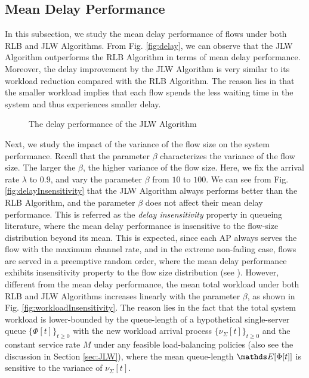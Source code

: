 \documentclass[10pt, conference, letterpaper]{IEEEtran} %
\begin{document}
\subsection{Mean Delay Performance}

In this subsection, we study the mean delay performance of flows under both RLB and JLW Algorithms. From Fig. \ref{fig:delay}, we can observe that the JLW Algorithm outperforms the RLB Algorithm in terms of mean delay performance. Moreover, the delay improvement by the JLW Algorithm is very similar to its workload reduction compared with the RLB Algorithm. The reason lies in that the smaller workload implies that each flow spends the less waiting time in the system and thus experiences smaller delay.

\begin{figure}[!hbt]
\vspace{-0.2in}
\centerline{ }\caption{The delay performance of the JLW Algorithm}
\vspace{-0.15in}
\end{figure}

Next, we study the impact of the variance of the flow size on the system performance. Recall that the parameter $\beta$ characterizes the variance of the flow size. The larger the $\beta$, the higher variance of the flow size. Here, we fix the arrival rate $\lambda$ to $0.9$, and vary the parameter $\beta$ from $10$ to $100$. We can see from Fig. \ref{fig:delayInsensitivity} that the JLW Algorithm always performs better than the RLB Algorithm, and the parameter $\beta$ does not affect their mean delay performance. This is referred as the \emph{delay insensitivity} property in queueing literature, where the mean delay performance is insensitive to the flow-size distribution beyond its mean. This is expected, since each AP always serves the flow with the maximum channel rate, and in the extreme non-fading case, flows are served in a preemptive random order, where the mean delay performance exhibits insensitivity property to the flow size distribution (see \cite{henderson1992insensitivity}). However, different from the mean delay performance, the mean total workload under both RLB and JLW Algorithms increases linearly with the parameter $\beta$, as shown in Fig. \ref{fig:workloadInsensitivity}. The reason lies in the fact that the total system workload is lower-bounded by the queue-length of a hypothetical single-server queue $\{\Phi[t]\}_{t\geq0}$ with the new workload arrival process $\{\nu_{\Sigma}[t]\}_{t\geq0}$ and the constant service rate $M$ under any feasible load-balancing policies (also see the discussion in Section \ref{sec:JLW}), where the mean queue-length $\bE[\Phi[t]]$ is sensitive to the variance of $\nu_{\Sigma}[t]$.
\end{document}
